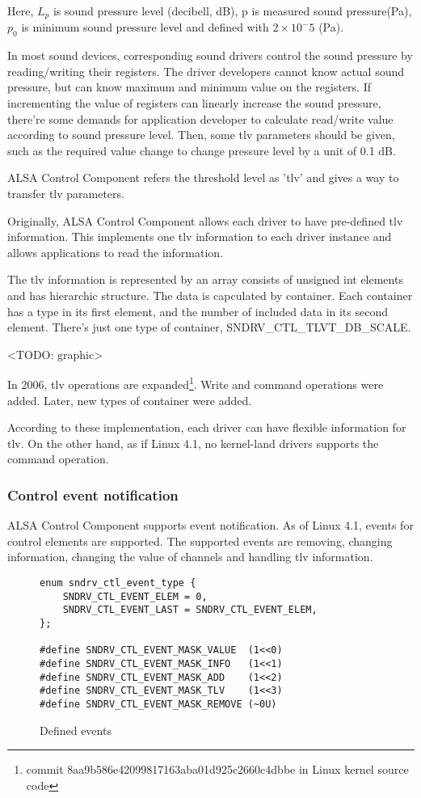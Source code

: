 \documentclass[onecolumn]{article}
\begin{document}
Here, $L_p$ is sound pressure level (decibell, dB), p is measured sound pressure(Pa), $p_0$ is minimum sound pressure level and defined with $2 \times 10^-5$ (Pa).

In most sound devices, corresponding sound drivers control the sound pressure by reading/writing their registers. The driver developers cannot know actual sound pressure, but can know maximum and minimum value on the registers. If incrementing the value of registers can linearly increase the sound pressure, there're some demands for application developer to calculate read/write value according to sound pressure level. Then, some tlv parameters should be given, such as the required value change to change pressure level by a unit of 0.1 dB.

ALSA Control Component refers the threshold level as 'tlv' and gives a way to transfer tlv parameters.

Originally, ALSA Control Component allows each driver to have pre-defined tlv information. This implements one tlv information to each driver instance and allows applications to read the information.

The tlv information is represented by an array consists of unsigned int elements and  has hierarchic structure. The data is capculated by container. Each container has a type in its first element, and the number of included data in its second element. There's just one type of container, SNDRV\_CTL\_TLVT\_DB\_SCALE.

<TODO: graphic>

In 2006, tlv operations are expanded\footnote{commit 8aa9b586e42099817163aba01d925c2660c4dbbe in Linux kernel source code}. Write and command operations were added. Later, new types of container were added.

According to these implementation, each driver can have flexible information for tlv. On the other hand, as if Linux 4.1, no kernel-land drivers supports the command operation.


\subsubsection{Control event notification}

ALSA Control Component supports event notification. As of Linux 4.1, events for control elements are supported. The supported events are removing, changing information, changing the value of channels and handling tlv information.

\begin{figure}[htbp]
\small
\begin{verbatim}
enum sndrv_ctl_event_type {
    SNDRV_CTL_EVENT_ELEM = 0,
    SNDRV_CTL_EVENT_LAST = SNDRV_CTL_EVENT_ELEM,
};

#define SNDRV_CTL_EVENT_MASK_VALUE  (1<<0)
#define SNDRV_CTL_EVENT_MASK_INFO   (1<<1)
#define SNDRV_CTL_EVENT_MASK_ADD    (1<<2)
#define SNDRV_CTL_EVENT_MASK_TLV    (1<<3)
#define SNDRV_CTL_EVENT_MASK_REMOVE (~0U)
\end{verbatim}
\caption{{Defined events}}
\label{defined-events}
\end{figure}
\end{document}
